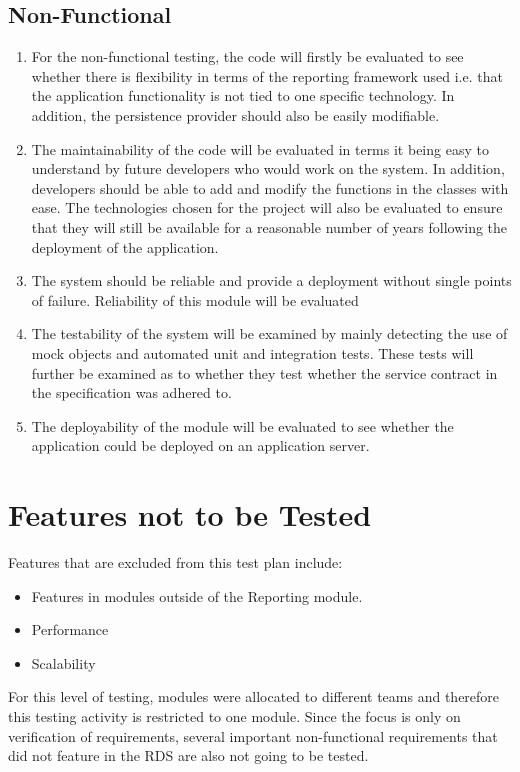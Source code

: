 \subsection{Non-Functional}
\begin{enumerate}
\item For the non-functional testing, the code will firstly be evaluated to see whether there is flexibility in terms of the reporting framework used i.e. that the application functionality is not tied to one specific technology. In addition, the persistence provider should also be easily modifiable.
\item The maintainability of the code will be evaluated in terms it being easy to understand by future developers who would work on the system. In addition, developers should be able to add and modify the functions in the classes with ease. The technologies chosen for the project will also be evaluated to ensure that they will still be available for a reasonable number of years following the deployment of the application.
\item The system should be reliable and provide a deployment without single points of failure. Reliability of this module will be evaluated
\item The testability of the system will be examined by mainly detecting the use of mock objects and automated unit and integration tests. These tests will further be examined as to whether they test whether the service contract in the specification was adhered to.
\item The deployability of the module will be evaluated to see whether the application could be deployed on an application server.
\end{enumerate}

\section{Features not to be Tested}
\label{sec:featuresNotToTest}
Features that are excluded from this test plan include:
\begin{itemize}
	\item Features in modules outside of the Reporting module.
	\item Performance
	\item Scalability
\end{itemize}
For this level of testing, modules were allocated to different teams and therefore this testing activity is restricted to one module. Since the focus is only on verification of requirements, several important non-functional requirements that did not feature in the RDS are also not going to be tested.

